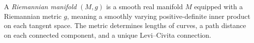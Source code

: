 
A \emph{Riemannian manifold} $(M,g)$ is a smooth real manifold $M$ equipped with a Riemannian metric $g$, meaning a smoothly varying positive-definite inner product on each tangent space. The metric determines lengths of curves, a path distance on each connected component, and a unique Levi--Civita connection.
